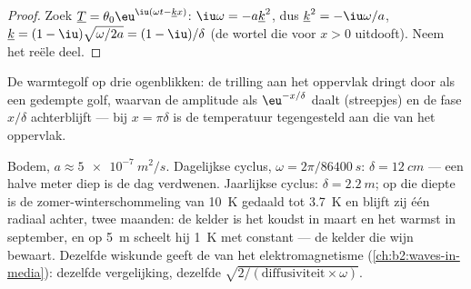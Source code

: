 \begin{proof}
Zoek $\underline T = \theta_0\eu^{\iu(\omega t - \underline k x)}$:
$\iu\omega = -a\underline k^2$, dus $\underline k^2 = -\iu\omega/a$,
$\underline k = (1 - \iu)\sqrt{\omega/2a} = (1 - \iu)/\delta$ (de wortel
die voor $x > 0$ uitdooft). Neem het reële deel.
\end{proof}

\begin{omfigure}

{\small De warmtegolf op drie ogenblikken: de trilling aan het oppervlak
dringt door als een gedempte golf, waarvan de amplitude als $\eu^{-x/\delta}$
daalt (streepjes) en de fase $x/\delta$ achterblijft --- bij $x = \pi\delta$ is de
temperatuur tegengesteld aan die van het oppervlak.}
\end{omfigure}

\begin{example}\label{ex:b2:heat-conduction:soil}
Bodem, $a \approx \qty{5e-7}{m^2/s}$. Dagelijkse cyclus,
$\omega = 2\pi/\qty{86400}{s}$:
$\delta = \qty{12}{cm}$ --- een halve meter diep is de dag verdwenen.
Jaarlijkse cyclus:
$\delta = \qty{2.2}{m}$; op die diepte is de zomer-winterschommeling van \qty{10}{K}
gedaald tot \qty{3.7}{K} en blijft zij één radiaal achter, twee maanden: de
kelder is
het koudst in maart en het warmst in september, en op \qty{5}{m} scheelt hij
\qty{1}{K} met constant --- de kelder die wijn bewaart. Dezelfde
wiskunde geeft de  van het elektromagnetisme
(\cref{ch:b2:waves-in-media}): dezelfde vergelijking, dezelfde
$\sqrt{2/(\text{diffusiviteit}
\times\omega)}$.
\end{example}

